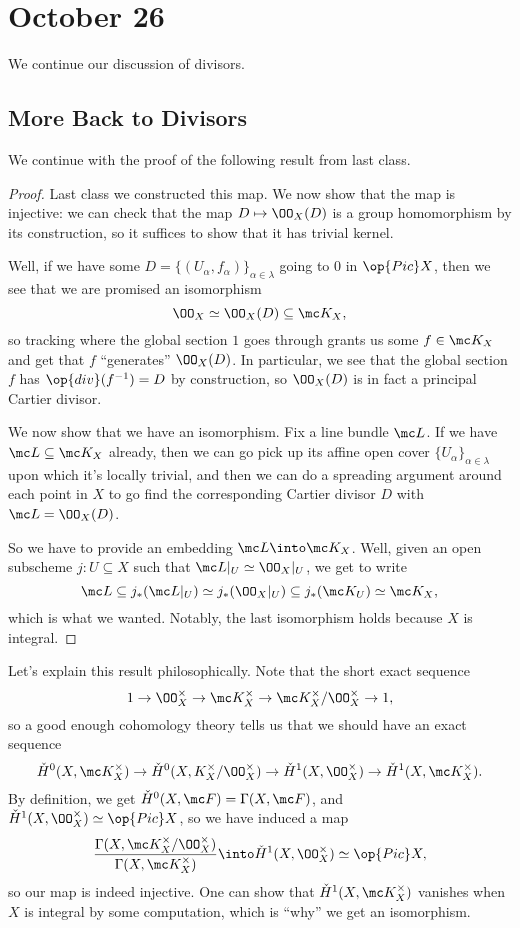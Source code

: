 \documentclass[../notes.tex]{subfiles}
\begin{document}
\section{October 26}

We continue our discussion of divisors.

\subsection{More Back to Divisors}
We continue with the proof of the following result from last class.
\cacltopic*
\begin{proof}
	Last class we constructed this map. We now show that the map is injective: we can check that the map $D\mapsto\OO_X(D)$ is a group homomorphism by its construction, so it suffices to show that it has trivial kernel.

	Well, if we have some $D=\{(U_\alpha,f_\alpha)\}_{\alpha\in\lambda}$ going to $0$ in $\op{Pic}X$, then we see that we are promised an isomorphism
	\[\OO_X\simeq\OO_X(D)\subseteq\mc K_X,\]
	so tracking where the global section $1$ goes through grants us some $f\in\mc K_X$ and get that $f$ ``generates'' $\OO_X(D)$. In particular, we see that the global section $f$ has $\op{div}(f^{-1})=D$ by construction, so $\OO_X(D)$ is in fact a principal Cartier divisor.

	We now show that we have an isomorphism. Fix a line bundle $\mc L$. If we have $\mc L\subseteq\mc K_X$ already, then we can go pick up its affine open cover $\{U_\alpha\}_{\alpha\in\lambda}$ upon which it's locally trivial, and then we can do a spreading argument around each point in $X$ to go find the corresponding Cartier divisor $D$ with $\mc L=\OO_X(D)$.

	So we have to provide an embedding $\mc L\into\mc K_X$. Well, given an open subscheme $j\colon U\subseteq X$ such that $\mc L|_U\simeq\OO_X|_U$, we get to write
	\[\mc L\subseteq j_*(\mc L|_U)\simeq j_*(\OO_X|_U)\subseteq j_*(\mc K_U)\simeq\mc K_X,\]
	which is what we wanted. Notably, the last isomorphism holds because $X$ is integral.
\end{proof}
\begin{remark}
	Let's explain this result philosophically. Note that the short exact sequence
	\[1\to\OO_X^\times\to\mc K_X^\times\to\mc K_X^\times/\OO_X^\times\to1,\]
	so a good enough cohomology theory tells us that we should have an exact sequence
	\[\check H^0(X,\mc K_X^\times)\to\check H^0(X,K_X^\times/\OO_X^\times)\to\check H^1(X,\OO_X^\times)\to\check H^1(X,\mc K_X^\times).\]
	By definition, we get $\check H^0(X,\mc F)=\Gamma(X,\mc F)$, and $\check H^1(X,\OO_X^\times)\simeq\op{Pic}X$, so we have induced a map
	\[\frac{\Gamma(X,\mc K_X^\times/\OO_X^\times)}{\Gamma(X,\mc K_X^\times)}\into\check H^1(X,\OO_X^\times)\simeq\op{Pic}X,\]
	so our map is indeed injective. One can show that $\check H^1(X,\mc K_X^\times)$ vanishes when $X$ is integral by some computation, which is ``why'' we get an isomorphism.
\end{remark}
\end{document}
